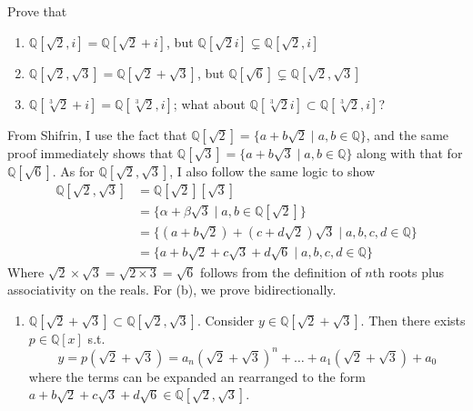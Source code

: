   \begin{exercise}[Shifrin 3.2.2.b/c]
    Prove that
    \begin{enumerate}
      \item $\mathbb{Q}[\sqrt{2}, i] = \mathbb{Q}[\sqrt{2} + i]$, but $\mathbb{Q}[\sqrt{2}i] \subsetneq \mathbb{Q}[\sqrt{2}, i]$
      \item $\mathbb{Q}[\sqrt{2}, \sqrt{3}] = \mathbb{Q}[\sqrt{2} + \sqrt{3}]$, but $\mathbb{Q}[\sqrt{6}] \subsetneq \mathbb{Q}[\sqrt{2}, \sqrt{3}]$
      \item $\mathbb{Q}[\sqrt[3]{2} + i] = \mathbb{Q}[\sqrt[3]{2}, i]$; what about $\mathbb{Q}[\sqrt[3]{2}i] \subset \mathbb{Q}[\sqrt[3]{2}, i]$?
    \end{enumerate}
  \end{exercise}
  \begin{solution}[Shifrin 3.2.2.b]
    From Shifrin, I use the fact that $\mathbb{Q}[\sqrt{2}] = \{ a + b \sqrt{2} \mid a, b \in \mathbb{Q}\}$, and the same proof immediately shows that $\mathbb{Q}[\sqrt{3}] = \{ a + b \sqrt{3} \mid a, b \in \mathbb{Q}\}$ along with that for $\mathbb{Q}[\sqrt{6}]$. As for $\mathbb{Q}[\sqrt{2}, \sqrt{3}]$, I also follow the same logic to show 
    \begin{align}
      \mathbb{Q}[\sqrt{2}, \sqrt{3}] & = \mathbb{Q}[\sqrt{2}][\sqrt{3}] \\
                                     & = \{\alpha + \beta \sqrt{3} \mid a, b \in \mathbb{Q}[\sqrt{2}]\} \\
                                     & = \{ (a + b\sqrt{2}) + (c + d \sqrt{2}) \sqrt{3} \mid a, b, c, d \in \mathbb{Q} \} \\
                                     & = \{ a + b\sqrt{2} + c \sqrt{3} + d \sqrt{6} \mid a, b, c, d \in \mathbb{Q} \} 
    \end{align}
    Where $\sqrt{2} \times \sqrt{3} = \sqrt{2 \times 3} = \sqrt{6}$ follows from the definition of $n$th roots plus associativity on the reals. For (b), we prove bidirectionally.
    \begin{enumerate}
      \item $\mathbb{Q}[ \sqrt{2} + \sqrt{3}] \subset \mathbb{Q}[\sqrt{2}, \sqrt{3}]$. Consider $y \in \mathbb{Q}[\sqrt{2} + \sqrt{3}]$. Then there exists $p \in \mathbb{Q}[x]$ s.t. 
      \begin{equation}
        y = p(\sqrt{2} + \sqrt{3}) = a_n (\sqrt{2} + \sqrt{3})^n + \ldots + a_1 (\sqrt{2} + \sqrt{3}) + a_0
      \end{equation}
      where the terms can be expanded an rearranged to the form $a + b \sqrt{2} + c \sqrt{3} + d \sqrt{6} \in \mathbb{Q}[\sqrt{2}, \sqrt{3}]$. 


\end{enumerate}
\end{solution}
